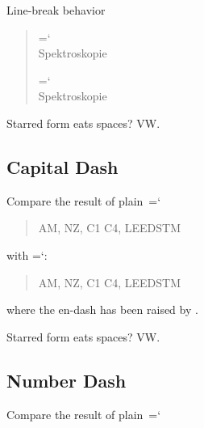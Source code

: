 \documentclass[a4paper]{article}
\newcommand*{\acronym}[1]{\mbox{\letterspacecapitals{\MakeUppercase{#1}}}}
\newcommand*{\code}[1]{{\ttfamily\hyphenchar\font=`\-\relax #1}}
\newcommand*{\letterspacecapitals}[1]{\textls[30]{#1}}
\begin{document}
\noindent Line-break behavior

\begin{quote}
  \setlength{\overfullrule}{0pt}
  \begin{otherlanguage}{german}
    \parbox[t]{0pt}{%
      \code{\string\capitalhyphen*}  \\
      \acronym{NMR}\capitalhyphen*{}Spektroskopie
    }
    \hspace{120pt}
    \parbox[t]{0pt}{%
      \code{\string\capitalhyphen}  \\
      \acronym{NMR}\capitalhyphen{}Spektroskopie
    }
  \end{otherlanguage}
\end{quote}

\noindent Starred form eats spaces?
{
  V\capitalhyphen*  W.}

\subsection{Capital Dash}

\newlength{\exemplaryraisecapitaldash}
\setlength{\exemplaryraisecapitaldash}{.075em}

Compare the result of plain~\code{\string\textendash}

\begin{quote}
  A\textendash M, N\textendash Z,  C1\,\textendash\,C4, LEED\:\textendash\:STM
\end{quote}

\noindent with \code{\string\capitaldash}:

\begin{quote}

  A\capitaldash{}M, N\capitaldash{}Z,  C1\,\capitaldash\,C4, LEED\:\capitaldash\:STM
\end{quote}

\noindent where the en-dash has been raised by \milliem{\exemplaryraisecapitaldash}.

Starred form eats spaces?  V\capitaldash*  W.

\subsection{Number Dash}

\newlength{\exemplaryraisefiguredash}
\setlength{\exemplaryraisefiguredash}{.6667pt}
Compare the result of plain~\code{\string\textendash}
\end{document}
